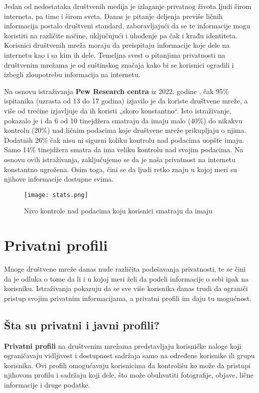 \documentclass[12pt, a4paper]{article}
\begin{document}
{Jedan od nedostataka društvenih medija je izlaganje privatnog života ljudi širom interneta, pa time i širom sveta. Danas je pitanje deljenja previše ličnih informacija postalo društveni standard, zaboravljajući da se te informacije mogu koristiti na različite načine, uključujući i uhođenje pa čak i krađu identiteta. Korisnici društvenih mreža moraju da preispitaju informacije koje dele na internetu kao i sa kim ih dele.
Temeljna svest o pitanjima privatnosti na društvenim mrežama je od suštinskog značaja kako bi se korisnici ogradili i izbegli zloupotrebu informacija na internetu.

Na osnovu istraživanja \textbf{Pew Research centra} iz 2022. godine \cite{pew2022}, čak 95\% ispitanika (uzrasta od 13 do 17 godina) izjavilo je da  koriste društvene mreže, a više od trećine izjavljuje da ih koristi „skoro konstantno“. Isto istraživanje, pokazalo je i da 6 od 10 tinejdžera smatraju da imaju malo (40\%) do nikakvu kontrolu (20\%) nad ličnim podacima koje društvene mreže prikupljaju o njima. Dodatnih 26\%  čak nisu ni sigurni koliku kontrolu nad podacima uopšte imaju. Samo 14\% tinejdžera smatra da ima veliku kontrolu nad svojim podacima. Na osnovu ovih istraživanja, zaključujemo se da je naša privatnost na
internetu konstantno ugrožena. Osim toga, čini se da ljudi retko znaju u
kojoj meri su njihove informacije dostupne svima.

\begin{figure}[h]
    \centering
    \texttt{[image: stats.png]}
    \label{fig:graf1}
    \caption{Nivo kontrole nad podacima koju korisnici smatraju da imaju}
\end{figure}

\newpage
\section{Privatni profili}

Mnoge društvene mreže danas nude različita podešavanja privatnosti, te se čini da je odluka o tome da li i u kojoj meri želi da podeli informacije o sebi ipak na korisniku. Istraživanja pokazuju da se sve više korisnika danas trudi da ograniči pristup svojim privatnim informacijama, a privatni profili im daju tu mogućnost.

\subsection{Šta su privatni i javni profili?}
\label{sec:Priv}

\textbf{Privatni profili }na društvenim mrežama predstavljaju korisničke naloge koji ograničavaju vidljivost i dostupnost sadržaja samo na određene korisnike ili grupu korisnika. Ovi profili omogućavaju korisnicima da kontrolišu ko može da pristupi njihovom profilu i sadržaju koji dele, što može obuhvatiti fotografije, objave, lične informacije i druge podatke. 


}
\end{document}
